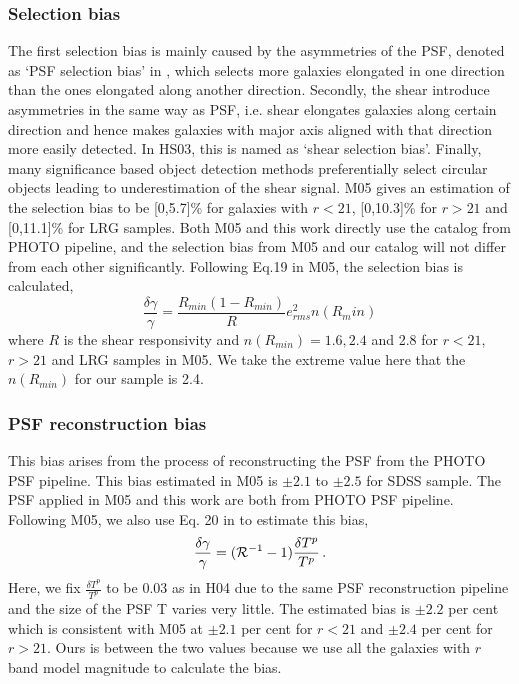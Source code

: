 \documentclass[apj]{emulateapj}
\begin{document}
\subsubsection{Selection bias}

The first selection bias is mainly caused by the asymmetries of the
PSF, denoted as `PSF selection bias' in \citet{Kaiser2000}, which
selects more galaxies elongated in one direction than the ones
elongated along another direction. Secondly, the shear introduce
asymmetries in the same way as PSF, i.e. shear elongates galaxies
along certain direction and hence makes galaxies with major axis
aligned with that direction more easily detected. In HS03, this is
named as `shear selection bias'. Finally, many significance based
object detection methods preferentially select circular objects leading
to underestimation of the shear signal. M05 gives an estimation of the
selection bias to be [0,5.7]\% for galaxies with $r<21$, [0,10.3]\%
for $r>21$ and [0,11.1]\% for LRG samples. Both M05 and this work directly
use the catalog from PHOTO pipeline, and the selection bias from M05
and our catalog will not differ from each other significantly.
Following Eq.19 in M05, the selection bias is calculated,
\begin{equation}
\frac{\delta \gamma}{\gamma}=
\frac{R_{min}(1-R_{min})}{\textit{R}}e_{rms}^2n(R_min)
\end{equation}
where $\textit{R}$ is the shear responsivity and
$n(R_{min})=1.6, 2.4$ and 2.8 for $r<21$, $r>21$ and LRG samples in M05.
We take the extreme value here that the $n(R_{min})$ for our sample is 2.4.


\subsubsection{PSF reconstruction bias}

This bias arises from the process of reconstructing the PSF from the
PHOTO PSF pipeline. This bias estimated in M05 is $\pm 2.1$ to $\pm
2.5$ for SDSS sample. The PSF applied in M05 and this work are both
from PHOTO PSF pipeline. Following M05, we also use Eq. 20 in 
\citet{Hirata2004} to estimate this bias,
\begin{equation}
\frac{\delta\gamma}{\gamma}=({\cal R}^{-1}-1)\frac{\delta T^p}{T^p}\,.
\end{equation}
Here, we fix $\frac{\delta T^p}{T^p}$ to be 0.03 as in H04 due to the
same PSF reconstruction pipeline and the size of the PSF T varies very
little. The estimated bias is $\pm 2.2$ per cent which is consistent
with M05 at $\pm 2.1$ per cent for $r<21$ and $\pm 2.4$ per cent for
$r>21$. Ours is between the two values because we use all the galaxies
with $r$ band model magnitude to calculate the bias.
\end{document}
